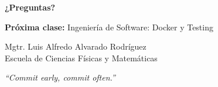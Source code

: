 \documentclass[aspectratio=169]{beamer}
\begin{document}
\begin{frame}
    \centering
    \Huge \textbf{¿Preguntas?}
    
    \vspace{0.8cm}
    \large
    \textbf{Próxima clase:} Ingeniería de Software: Docker y Testing
    
    \vspace{0.5cm}
    \normalsize
    Mgtr. Luis Alfredo Alvarado Rodríguez\\
    \small Escuela de Ciencias Físicas y Matemáticas
    
    \vspace{0.5cm}
    \footnotesize
    \textit{``Commit early, commit often.''}
\end{frame}
\end{document}

